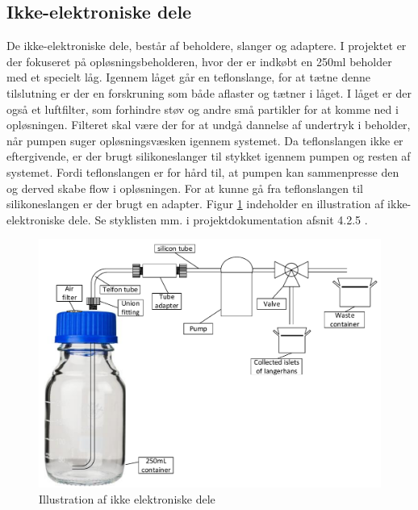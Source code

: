 \newpage
\subsection{Ikke-elektroniske dele}
De ikke-elektroniske dele, består af beholdere, slanger og adaptere. I projektet er der fokuseret på opløsningsbeholderen, hvor der er indkøbt en 250ml beholder med et specielt låg. Igennem låget går en teflonslange, for at tætne denne tilslutning er der en forskruning som både aflaster og tætner i låget. I låget er der også et luftfilter, som forhindre støv og andre små partikler for at komme ned i opløsningen. Filteret skal være der for at undgå dannelse af undertryk i beholder, når pumpen suger opløsningsvæsken igennem systemet. Da teflonslangen ikke er eftergivende, er der brugt silikoneslanger til stykket igennem pumpen og resten af systemet. Fordi teflonslangen er for hård til, at pumpen kan sammenpresse den og derved skabe flow i opløsningen. For at kunne gå fra teflonslangen til silikoneslangen er der brugt en adapter. Figur \ref{fig:nonelectronic} indeholder en illustration af ikke-elektroniske dele. Se styklisten mm. i projektdokumentation afsnit 4.2.5 .

\begin{figure}[H]
	\centering
	\includegraphics[width=1\textwidth]{billeder/Hovedrapport/ikkeelektronisk.pdf}
	\caption{Illustration af ikke elektroniske dele}
	\label{fig:nonelectronic}
\end{figure}


